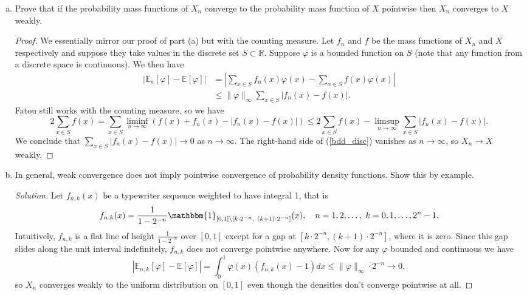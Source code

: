 \documentclass[11pt,letterpaper]{report}
\newcommand{\reals}{\mathbb{R}}
\newcommand{\E}{\mathbb{E}}
\newcommand{\ind}{\mathbbm{1}}
\newenvironment{solution}
{\begin{proof}[Solution]}
{\end{proof}}
\begin{document}
\begin{enumerate}[(a)]
	\item Prove that if the probability mass functions of $X_n$ converge to the probability mass function of $X$ pointwise then $X_n$ converges to $X$ weakly.
	\begin{proof}
		We essentially mirror our proof of part (a) but with the counting measure. Let $f_n$ and $f$ be the mass functions of $X_n$ and $X$ respectively and suppose they take values in the discrete set $S\subset \reals$. Suppose $\varphi$ is a bounded function on $S$ (note that any function from a discrete space is continuous). We then have
		\begin{equation}\label{bdd_disc}
			\begin{split}
				|\E_n[\varphi] - \E[\varphi]| &= \left|\sum_{x\in S}f_n(x)\varphi(x) - \sum_{x\in S}f(x)\varphi(x)\right|\\
				&\leq \|\varphi\|_\infty \sum_{x\in S}|f_n(x) -f(x)|.
			\end{split}
		\end{equation}
		Fatou still works with the counting measure, so we have
		\[
		2\sum_{x\in S}f(x) = \sum_{x\in S}\liminf_{n\to \infty}(f(x) + f_n(x) - |f_n(x)-f(x)|)\leq 2\sum_{x\in S}f(x) - \limsup_{n\to \infty}\sum_{x\in S}|f_n(x)-f(x)|.
		\]
		We conclude that $\sum_{x\in S}|f_n(x)-f(x)|\to 0$ as $n\to \infty$. The right-hand side of (\ref{bdd_disc}) vanishes as $n\to \infty$, so $X_n\to X$ weakly.
	\end{proof}

	\item In general, weak convergence does not imply pointwise convergence of probability density functions. Show this by example.
	\begin{solution}
		Let $f_{n,k}(x)$ be a typewriter sequence weighted to have integral 1, that is
		\[
		f_{n,k}(x) = \frac{1}{1-2^{-n}}\ind_{[0,1]\setminus [k\cdot 2^{-n},\ (k+1)\cdot 2^{-n}]}(x),\quad n = 1, 2, \ldots,\ k = 0, 1, \ldots, 2^{n}-1.
		\]
		Intuitively, $f_{n,k}$ is a flat line of height $\frac{1}{1-2^{-n}}$ over $[0,1]$ except for a gap at $[k\cdot 2^{-n}, (k+1)\cdot 2^{-n}]$, where it is zero. Since this gap slides along the unit interval indefinitely, $f_{n,k}$ does not converge pointwise anywhere. Now for any $\varphi$ bounded and continuous we have
		\[
		|\E_{n,k}[\varphi] - \E[\varphi]| = \int_0^1\varphi(x)(f_{n,k}(x) - 1)dx \leq \|\varphi\|_\infty\cdot 2^{-n}\to 0,
		\]
		so $X_n$ converges weakly to the uniform distribution on $[0,1]$ even though the densities don't converge pointwise at all.
\end{solution}
\end{enumerate}
\end{document}
